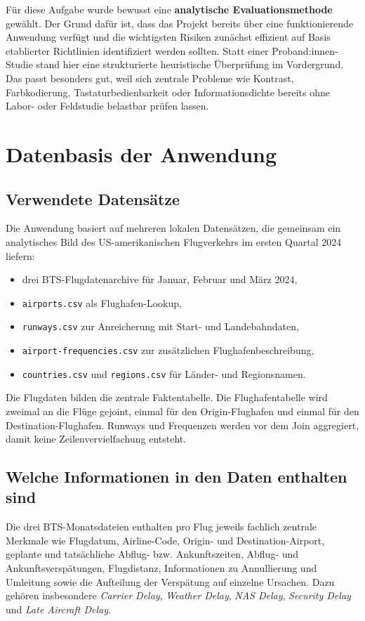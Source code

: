 \documentclass[11pt,a4paper]{article}
\begin{document}
Für diese Aufgabe wurde bewusst eine \textbf{analytische Evaluationsmethode} gewählt. Der Grund dafür ist, dass das Projekt bereits über eine funktionierende Anwendung verfügt und die wichtigsten Risiken zunächst effizient auf Basis etablierter Richtlinien identifiziert werden sollten. Statt einer Proband:innen-Studie stand hier eine strukturierte heuristische Überprüfung im Vordergrund. Das passt besonders gut, weil sich zentrale Probleme wie Kontrast, Farbkodierung, Tastaturbedienbarkeit oder Informationsdichte bereits ohne Labor- oder Feldstudie belastbar prüfen lassen.

\section{Datenbasis der Anwendung}
\subsection{Verwendete Datensätze}
Die Anwendung basiert auf mehreren lokalen Datensätzen, die gemeinsam ein analytisches Bild des US-amerikanischen Flugverkehrs im ersten Quartal 2024 liefern:

\begin{itemize}[leftmargin=1.2cm]
\item drei BTS-Flugdatenarchive für Januar, Februar und März 2024,
\item \texttt{airports.csv} als Flughafen-Lookup,
\item \texttt{runways.csv} zur Anreicherung mit Start- und Landebahndaten,
\item \texttt{airport-frequencies.csv} zur zusätzlichen Flughafenbeschreibung,
\item \texttt{countries.csv} und \texttt{regions.csv} für Länder- und Regionsnamen.
\end{itemize}

Die Flugdaten bilden die zentrale Faktentabelle. Die Flughafentabelle wird zweimal an die Flüge gejoint, einmal für den Origin-Flughafen und einmal für den Destination-Flughafen. Runways und Frequenzen werden vor dem Join aggregiert, damit keine Zeilenvervielfachung entsteht.

\subsection{Welche Informationen in den Daten enthalten sind}
Die drei BTS-Monatsdateien enthalten pro Flug jeweils fachlich zentrale Merkmale wie Flugdatum, Airline-Code, Origin- und Destination-Airport, geplante und tatsächliche Abflug- bzw. Ankunftszeiten, Abflug- und Ankunftsverspätungen, Flugdistanz, Informationen zu Annullierung und Umleitung sowie die Aufteilung der Verspätung auf einzelne Ursachen. Dazu gehören insbesondere \textit{Carrier Delay}, \textit{Weather Delay}, \textit{NAS Delay}, \textit{Security Delay} und \textit{Late Aircraft Delay}.
\end{document}
